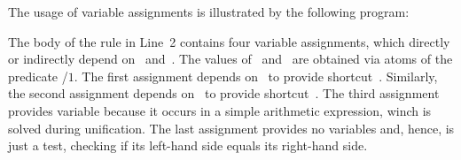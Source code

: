 \begin{example}\label{ex:assign}
The usage of variable assignments is illustrated by the following program:%
%
%

%
The body of the rule in Line~2 contains four variable assignments,
which directly or indirectly depend on~ and~.
The values of~ and~ are obtained via atoms of the predicate /$1$.
The first assignment depends on~ to provide shortcut~.
Similarly, the second assignment depends on~ to provide shortcut~.
The third assignment provides variable  because it occurs in a simple arithmetic expression,
winch is solved during unification.
The last assignment provides no variables and,
hence, is just a test,
checking if its left-hand side equals its right-hand side.
\eexample
\end{example}

